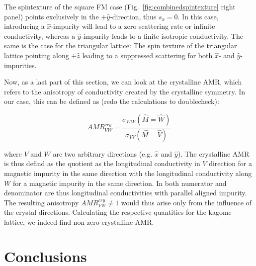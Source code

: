 \documentclass[prb,showpacs,amsmath,amssymb,superscriptaddress,twocolumn,floatfix]{revtex4-1}
\begin{document}
The spintexture of the square FM case (Fig.~\ref{fig:combinedspintexture} right panel) points exclusively in the $+\hat{y}$-direction, thus $s_x = 0$. In this case, introducing a $\hat{x}$-impurity will lead to a zero scattering rate or infinite conductivity, whereas a $\hat{y}$-impurity leads to a finite isotropic conductivity. The same is the case for the triangular lattice: The spin texture of the triangular lattice pointing along $+\hat{z}$ leading to a suppressed scattering for both $\hat{x}$- and $\hat{y}$-impurities.


Now, as a last part of this section, we can look at the crystalline AMR, which refers to the anisotropy of conductivity created by the crystalline symmetry. In our case, this can be defined as {\color{red} (redo the calculations to doublecheck)}:

\begin{equation}
	AMR^{cry}_{VW} = \frac{\sigma_{WW} (\hat{M} = \hat{W})}{\sigma_{VV} (\hat{M} = \hat{V})}
\end{equation}
 
where $V$ and $W$ are two arbitrary directions (e.g. $\hat{x}$ and $\hat{y}$). The crystalline AMR is thus defind as the quotient as the longitudinal conductivity in $V$ direction for a magnetic impurity in the same direction with the longitudinal conductivity along $W$ for a magnetic impurity in the same direction. In both numerator and denominator are thus longitudinal conductivities with parallel aligned impurity. The resulting anisotropy $AMR^{cry}_{VW} \neq 1$ would thus arise only from the influence of the crystal directions. Calculating the respective quantities for the kagome lattice, we indeed find non-zero crystalline AMR.

\section{Conclusions}
\end{document}
